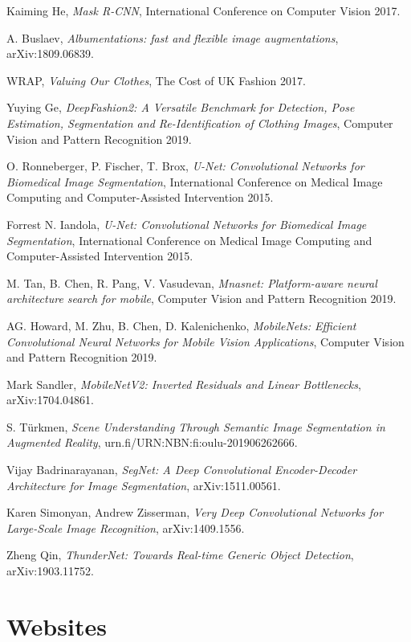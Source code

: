 \begin{thebibliography}{9}
Kaiming He,
\textit{Mask R-CNN}, International Conference on Computer Vision 2017.

A. Buslaev,
\textit{Albumentations: fast and flexible image augmentations}, arXiv:1809.06839.

WRAP,
\textit{Valuing Our Clothes}, The Cost of UK Fashion 2017.


Yuying Ge,
\textit{DeepFashion2: A Versatile Benchmark for Detection, Pose Estimation, Segmentation and Re-Identification of Clothing Images}, 
Computer Vision and Pattern Recognition 2019.

O. Ronneberger, P. Fischer, T. Brox,
\textit{U-Net: Convolutional Networks for Biomedical Image Segmentation}, 
International Conference on Medical Image Computing and Computer-Assisted Intervention 2015.


Forrest N. Iandola,
\textit{U-Net: Convolutional Networks for Biomedical Image Segmentation}, 
International Conference on Medical Image Computing and Computer-Assisted Intervention 2015.


M. Tan, B. Chen, R. Pang, V. Vasudevan,
\textit{Mnasnet: Platform-aware neural architecture search for mobile}, Computer Vision and Pattern Recognition 2019.

AG. Howard, M. Zhu, B. Chen, D. Kalenichenko,
\textit{MobileNets: Efficient Convolutional Neural Networks for Mobile Vision Applications}, Computer Vision and Pattern Recognition 2019.


Mark Sandler,
\textit{MobileNetV2: Inverted Residuals and Linear Bottlenecks}, arXiv:1704.04861.

S. Türkmen,
\textit{Scene Understanding Through Semantic Image Segmentation in Augmented Reality}, urn.fi/URN:NBN:fi:oulu-201906262666.

Vijay Badrinarayanan,
\textit{SegNet: A Deep Convolutional Encoder-Decoder Architecture for Image Segmentation}, arXiv:1511.00561.

Karen Simonyan, Andrew Zisserman,
\textit{Very Deep Convolutional Networks for Large-Scale Image Recognition}, 	arXiv:1409.1556.

Zheng Qin,
\textit{ThunderNet: Towards Real-time Generic Object Detection}, 		arXiv:1903.11752.

\section*{Websites}


\end{thebibliography}
